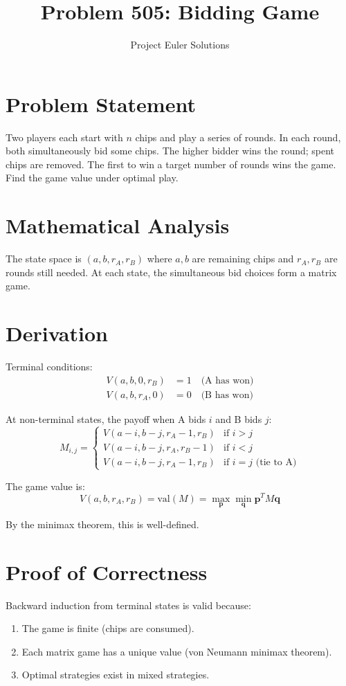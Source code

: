 \documentclass[11pt]{article}
\title{Problem 505: Bidding Game}
\author{Project Euler Solutions}
\date{}
\begin{document}
\maketitle

\section{Problem Statement}
Two players each start with $n$ chips and play a series of rounds. In each round, both simultaneously bid some chips. The higher bidder wins the round; spent chips are removed. The first to win a target number of rounds wins the game. Find the game value under optimal play.

\section{Mathematical Analysis}
The state space is $(a, b, r_A, r_B)$ where $a, b$ are remaining chips and $r_A, r_B$ are rounds still needed. At each state, the simultaneous bid choices form a matrix game.

\section{Derivation}
Terminal conditions:
\begin{align}
V(a, b, 0, r_B) &= 1 \quad \text{(A has won)} \\
V(a, b, r_A, 0) &= 0 \quad \text{(B has won)}
\end{align}

At non-terminal states, the payoff when A bids $i$ and B bids $j$:
\[
M_{i,j} = \begin{cases}
V(a-i, b-j, r_A-1, r_B) & \text{if } i > j \\
V(a-i, b-j, r_A, r_B-1) & \text{if } i < j \\
V(a-i, b-j, r_A-1, r_B) & \text{if } i = j \text{ (tie to A)}
\end{cases}
\]

The game value is:
\[
V(a, b, r_A, r_B) = \text{val}(M) = \max_{\mathbf{p}} \min_{\mathbf{q}} \mathbf{p}^T M \mathbf{q}
\]

By the minimax theorem, this is well-defined.

\section{Proof of Correctness}
Backward induction from terminal states is valid because:
\begin{enumerate}
    \item The game is finite (chips are consumed).
    \item Each matrix game has a unique value (von Neumann minimax theorem).
    \item Optimal strategies exist in mixed strategies.
\end{enumerate}
\end{document}
